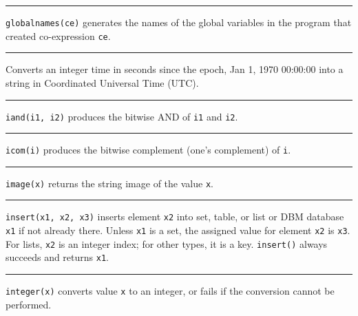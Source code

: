 \bigskip\hrule\vspace{0.1cm}

\noindent
{}\texttt{globalnames(ce)} generates the names of the global
variables in the program that created co-expression \texttt{ce}.

\bigskip\hrule\vspace{0.1cm}

\noindent
Converts an integer time in seconds since the epoch, Jan 1, 1970
00:00:00 into a string in Coordinated Universal Time (UTC). 

\bigskip\hrule\vspace{0.1cm}

\noindent
{}\texttt{iand(i1, i2)} produces the bitwise AND of
\texttt{i1} and \texttt{i2}.

\bigskip\hrule\vspace{0.1cm}

\noindent
\texttt{icom(i)} produces the bitwise complement (one's
complement) of \texttt{i}.

\bigskip\hrule\vspace{0.1cm}

\noindent
{}\texttt{image(x)} returns the string image of the value
\texttt{x}.

\bigskip\hrule\vspace{0.1cm}

\noindent
\texttt{insert(x1, x2, x3)} inserts element \texttt{x2} into set, table,
or list or DBM database \texttt{x1} if not already there. Unless
\texttt{x1} is a set, the assigned value for element \texttt{x2} is
\texttt{x3}. For lists, \texttt{x2} is an integer index; for other
types, it is a key. \texttt{insert()} always succeeds
and returns \texttt{x1}.

\bigskip\hrule\vspace{0.1cm}

\noindent
{}\texttt{integer(x)} converts value \texttt{x}
to an integer, or fails if the conversion cannot be performed.

